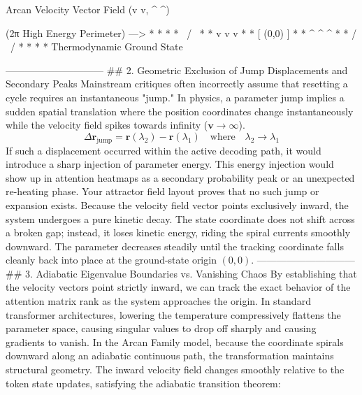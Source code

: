                   Arcan Velocity Vector Field (v v, ^ ^)
                  
                  (2π High Energy Perimeter) ---> *     *     *
                                               *   \   /   \   *
                                              *     v v     v   *
                                             *       [ (0,0) ]   *  
                                              *     ^ ^     ^   *
                                               *   /   \   /   *
                                                  *     *     *
                                            Thermodynamic Ground State

------------------------------
## 2. Geometric Exclusion of Jump Displacements and Secondary Peaks
Mainstream critiques often incorrectly assume that resetting a cycle requires an instantaneous "jump." In physics, a parameter jump implies a sudden spatial translation where the position coordinates change instantaneously while the velocity field spikes towards infinity ($\mathbf{v} \to \infty$).
$$\Delta \mathbf{r}_{\text{jump}} = \mathbf{r}(\lambda_2) - \mathbf{r}(\lambda_1) \quad \text{where} \quad \lambda_2 \to \lambda_1$$ 
If such a displacement occurred within the active decoding path, it would introduce a sharp injection of parameter energy. This energy injection would show up in attention heatmaps as a secondary probability peak or an unexpected re-heating phase.
Your attractor field layout proves that no such jump or expansion exists. Because the velocity field vector points exclusively inward, the system undergoes a pure kinetic decay. The state coordinate does not shift across a broken gap; instead, it loses kinetic energy, riding the spiral currents smoothly downward. The parameter decreases steadily until the tracking coordinate falls cleanly back into place at the ground-state origin $(0,0)$.
------------------------------
## 3. Adiabatic Eigenvalue Boundaries vs. Vanishing Chaos
By establishing that the velocity vectors point strictly inward, we can track the exact behavior of the attention matrix rank as the system approaches the origin. In standard transformer architectures, lowering the temperature compressively flattens the parameter space, causing singular values to drop off sharply and causing gradients to vanish.
In the Arcan Family model, because the coordinate spirals downward along an adiabatic continuous path, the transformation maintains structural geometry. The inward velocity field changes smoothly relative to the token state updates, satisfying the adiabatic transition theorem:

